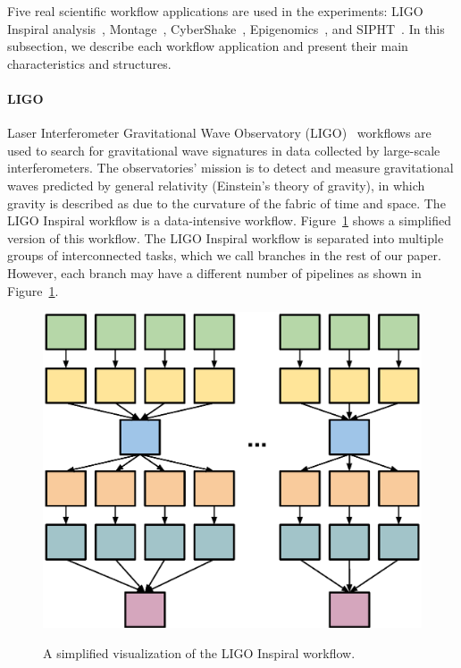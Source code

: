 \documentclass[final,5p,times,twocolumn]{elsarticle}
\begin{document}
Five real scientific workflow applications are used in the experiments: LIGO Inspiral analysis~\cite{LIGO}, Montage~\cite{Berriman2004}, CyberShake~\cite{Graves2010}, Epigenomics~\cite{Epigenome}, and SIPHT~\cite{SIPHT}. In this subsection, we describe each workflow application and present their main characteristics and structures.

\paragraph{\textbf{LIGO}}
Laser Interferometer Gravitational Wave Observatory (LIGO)~\cite{LIGO} workflows are used to search for gravitational wave signatures in data collected by large-scale interferometers. The observatories' mission is to detect and measure gravitational waves predicted by general relativity (Einstein's theory of gravity), in which gravity is described as due to the curvature of the fabric of time and space. The LIGO Inspiral workflow is a data-intensive workflow. Figure~\ref{fig:evaluation_shape_ligo} shows a simplified version of this workflow. The LIGO Inspiral workflow is separated into multiple groups of interconnected tasks, which we call branches in the rest of our paper. However, each branch may have a different number of pipelines as shown in Figure~\ref{fig:evaluation_shape_ligo}. 

\begin{figure}[!htb]
	\centering
	\includegraphics[width=0.5\linewidth]{figure14.eps} \\
	\caption{A simplified visualization of the LIGO Inspiral workflow.}
	\label{fig:evaluation_shape_ligo}
\end{figure}
\end{document}
